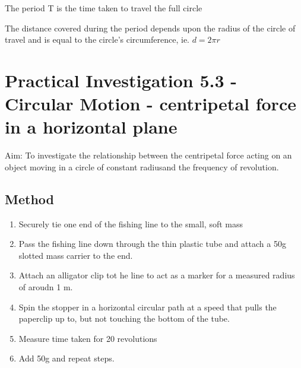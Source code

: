 The period T is the time taken to travel the full circle

The distance covered during the period depends upon the radius of the circle of travel and is equal to the circle's circumference, ie. $d=2\pi r$



\section{Practical Investigation 5.3 - Circular Motion - centripetal force in a horizontal plane}

	Aim: To investigate the relationship between the centripetal force acting on an object moving in a circle of constant radiusand the frequency of revolution.

\subsection{Method}
	\begin{enumerate}
		\item Securely tie one end of the fishing line to the small, soft mass
		\item Pass the fishing line down through the thin plastic tube and attach a 50g slotted mass carrier to the end.
		\item Attach an alligator clip tot he line to act as a marker for a measured radius of aroudn 1 m.
		\item Spin the stopper in a horizontal circular path at a speed that pulls the paperclip up to, but not touching the bottom of the tube.
		\item Measure time taken for 20 revolutions
		\item Add 50g and repeat steps.
	\end{enumerate}

